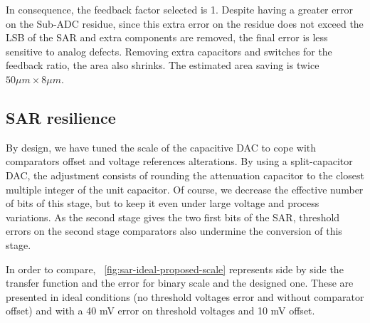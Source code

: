 In consequence, the feedback factor selected is 1. Despite having a greater error on the Sub-ADC residue, since this extra error on the residue does not exceed the LSB of the SAR and extra components are removed, the final error is less sensitive to analog defects. Removing extra capacitors and switches for the feedback ratio, the area also shrinks. The estimated area saving is twice $50 \mu m \times 8 \mu m$.

\subsection{SAR resilience}
By design, we have tuned the scale of the capacitive DAC to cope with comparators offset and voltage references alterations. By using a split-capacitor DAC, the adjustment consists of rounding the attenuation capacitor to the closest multiple integer of the unit capacitor. Of course, we decrease the effective number of bits of this stage, but to keep it even under large voltage and process variations. As the second stage gives the two first bits of the SAR, threshold errors on the second stage comparators also undermine the conversion of this stage.

In order to compare, \figurename~\ref{fig:sar-ideal-proposed-scale} represents side by side the transfer function and the error for binary scale and the designed one. These are presented in ideal conditions (no threshold voltages error and without comparator offset) and with a 40 mV error on threshold voltages and 10 mV offset.

